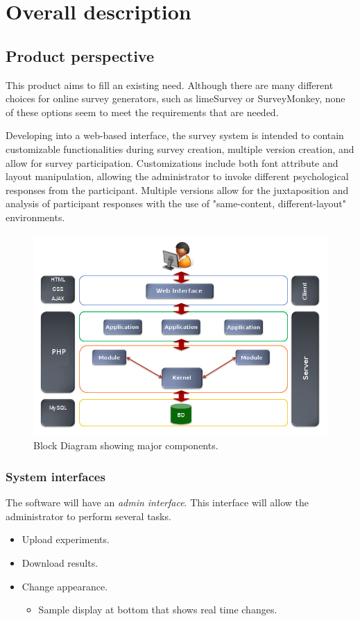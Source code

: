 \documentclass[a4paper,12pt,oneside]{report}
\begin{document}
\chapter{Overall description}

\section{Product perspective}
This product aims to fill an existing need. Although there are many different choices for online survey generators, such as limeSurvey or SurveyMonkey, none of these options  seem to meet the requirements that are needed.

Developing into a web-based interface, the survey system is intended to contain customizable functionalities during survey creation, multiple version creation, and allow for survey participation. Customizations include both font attribute and layout manipulation, allowing the administrator to invoke different psychological responses from the participant. Multiple versions allow for the juxtaposition and analysis of participant responses with the use of "same-content, different-layout" environments.

\begin{figure}[h!]
  \begin{center}
   \includegraphics[width=14cm]{pics/ar.png}
  \end{center}
\caption{Block Diagram showing major components.}
\end{figure}

\subsection{System interfaces}
The software will have an {\it admin interface}. This interface will allow the administrator to perform several tasks.
\begin{itemize}
\item Upload experiments.
\item Download results.
\item Change appearance.
\begin{itemize}
\item Sample display at bottom that shows real time changes.
\end{itemize}
\end{itemize}
\end{document}
